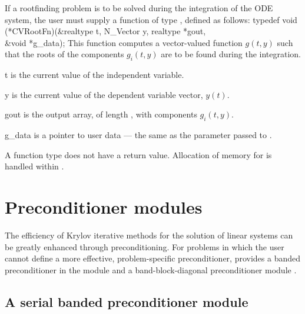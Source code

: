 If a rootfinding problem is to be solved during the integration of the ODE system,
the user must supply a {\C} function of type , defined as follows:
{
  typedef void (*CVRootFn)(&realtype t, N\_Vector y, realtype *gout, \\
                           &void *g\_data);
}
{
  This function computes a vector-valued function $g(t,y)$ such that the roots of
  the  components $g_i(t,y)$ are to be found during the integration.
}
{
  \begin{args}[g\_data]
  \item[t]
    is the current value of the independent variable.
  \item[y]
    is the current value of the dependent variable vector, $y(t)$.
  \item[gout]
    is the output array, of length , with components $g_i(t,y)$.
  \item[g\_data]
    is a pointer to user data --- the same as the       
    parameter passed to .   
  \end{args}
}
{
  A  function type does not have a return value.
}
{
  Allocation of memory for  is handled within {\cvode}.
}

\section{Preconditioner modules}\label{ss:preconds}

The efficiency of Krylov iterative methods for the solution of linear systems 
can be greatly enhanced through preconditioning. For problems in which the 
user cannot define a more effective, problem-specific preconditioner,
{\cvode} provides a banded preconditioner in the module {\cvbandpre} and
a band-block-diagonal preconditioner module {\cvbbdpre}.

\subsection{A serial banded preconditioner module}\label{sss:cvbandpre}


